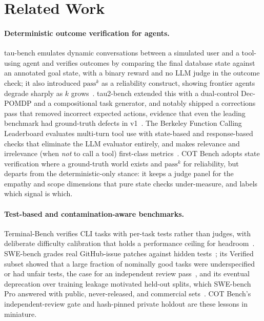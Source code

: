 \section{Related Work}
\label{sec:related}

\paragraph{Deterministic outcome verification for agents.} tau-bench emulates
dynamic conversations between a simulated user and a tool-using agent and verifies
outcomes by comparing the final database state against an annotated goal state,
with a binary reward and no LLM judge in the outcome check; it also introduced
$\text{pass}^k$ as a reliability construct, showing frontier agents degrade sharply
as $k$ grows~\cite{taubench2024}. tau2-bench extended this with a dual-control
Dec-POMDP and a compositional task generator, and notably shipped a corrections
pass that removed incorrect expected actions, evidence that even the leading
benchmark had ground-truth defects in v1~\cite{tau2bench2025}. The Berkeley
Function Calling Leaderboard evaluates multi-turn tool use with state-based and
response-based checks that eliminate the LLM evaluator entirely, and makes
relevance and irrelevance (when \emph{not} to call a tool) first-class
metrics~\cite{bfcl2024}. COT Bench adopts state verification where a ground-truth
world exists and $\text{pass}^k$ for reliability, but departs from the
deterministic-only stance: it keeps a judge panel for the empathy and scope
dimensions that pure state checks under-measure, and labels which signal is which.

\paragraph{Test-based and contamination-aware benchmarks.} Terminal-Bench verifies
CLI tasks with per-task tests rather than judges, with deliberate difficulty
calibration that holds a performance ceiling for headroom~\cite{terminalbench2026}.
SWE-bench grades real GitHub-issue patches against hidden tests~\cite{swebench2023};
its Verified subset showed that a large fraction of nominally good tasks were
underspecified or had unfair tests, the case for an independent review
pass~\cite{swebenchverified2024}, and its eventual deprecation over training
leakage motivated held-out splits, which SWE-bench Pro answered with public,
never-released, and commercial sets~\cite{swebenchpro2025}. COT Bench's
independent-review gate and hash-pinned private holdout are these lessons in
miniature.

